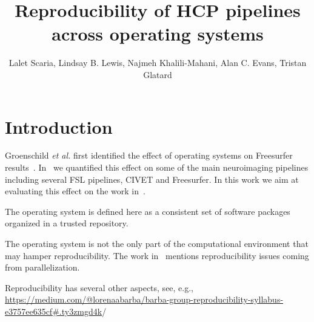 \documentclass{article}
\title{Reproducibility of HCP pipelines across operating systems}
\author{Lalet Scaria, Lindsay B. Lewis, Najmeh Khalili-Mahani, Alan C. Evans, Tristan Glatard}
\begin{document}
\maketitle


\section{Introduction}

Groenschild \emph{et al.} first identified the effect of operating
systems on Freesurfer results~\cite{Gronenschild2012}. In~\cite{10.3389/fninf.2015.00012} 
we quantified this effect on some of the main neuroimaging pipelines
including several FSL pipelines, CIVET and Freesurfer. In this work we
aim at evaluating this effect on the work in~\cite{glasser2015multi}.

The operating system is defined here as a consistent set of software
packages organized in a trusted repository.

The operating system is not the only part of the computational
environment that may hamper reproducibility. The work
in~\cite{diethelm2012limits} mentions reproducibility issues coming
from parallelization.

Reproducibility has several other aspects, see, e.g.,
\url{https://medium.com/@lorenaabarba/barba-group-reproducibility-syllabus-e3757ee635cf#.ty3zmgd4k}/
\end{document}
